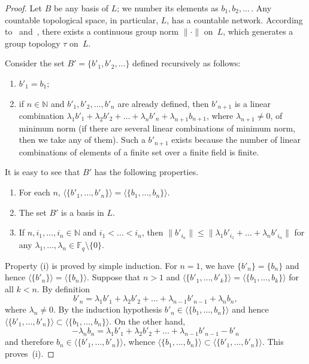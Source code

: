\documentclass[a4paper]{amsart}
\theoremstyle{definition}
\let\le\leqslant
\begin{document}
\begin{proof}
Let $B$ be any basis of $L$; we number its elements as $b_1,b_2, \dots$\,. Any countable 
topological space, in particular, $L$, has a countable network. According to~\cite[Lemma~8.1.12]{AT} 
and~\cite{Graev50}, there exists a continuous group norm $\lVert\boldsymbol\cdot\rVert$ on~$L$, which 
generates a group topology $\tau$ on~$L$. 

Consider the set $B'=\{b'_1, b'_2, \dots\}$ defined recursively as follows: 
\begin{enumerate} 
\item[(i)] 
$b'_1= b_1$; 

\item[(ii)] 
if $n\in \mathbb N$ and $b'_1, b'_2, \dots, b'_{n}$ are already defined, then $b'_{n+1}$ is a linear 
combination $\lambda_1 b'_1 +\lambda_2 b'_2 + \dots+ \lambda_n b'_{n}+\lambda_{n+1} b_{n+1}$, where 
$\lambda_{n+1}\ne 0$, of minimum norm (if there are several linear combinations of minimum norm, then we take any 
of them). Such a $b'_{n+1}$ exists because the number of linear combinations of elements of a finite set over a 
finite field is finite.
\end{enumerate}

It is easy to see that $B'$ has the following properties.
\begin{enumerate} 
\item[(iii)]
For each $n$,  $\langle \{b'_1, \dots, b'_n\}\rangle = \langle \{b_1, \dots, b_n\}\rangle $.
\item[(iv)]
The set $B'$ is a basis in $L$. 
\item[(v)]
If $n, i_1,\dots, i_n\in \mathbb N$ and $i_1<\dots <i_n$, then $\|b'_{i_n}\|\le 
\|\lambda_1 b'_{i_1}+\dots +\lambda_n b'_{i_n}\|$ for any $\lambda_1, \dots, \lambda_n\in 
\mathbb F_q\setminus\{0\}$. 
\end{enumerate} 

Property (i) is proved by simple induction. For $n=1$, we have $\{b'_n\}=\{b_n\}$ and hence 
$\langle \{b'_n\}\rangle =\langle \{b_n\}\rangle$. Suppose that $n>1$ and 
$\langle \{b'_1, \dots, b'_k\}\rangle = \langle \{b_1, \dots, b_k\}\rangle$ for all $k<n$. 
By definition 
$$
b'_n=\lambda_1 b'_1+ \lambda_2b'_2+ \dots +\lambda_{n-1}b'_{n-1}+\lambda_n b_n,
$$ 
where $\lambda_n\ne 0$. By the induction hypothesis 
$b'_n\in \langle \{b_1, \dots, b_n\}\rangle$ and hence $\langle \{b'_1, \dots, b'_n\}\rangle \subset 
\langle \{b_1, \dots, b_n\}\rangle$. On the other hand, 
$$
-\lambda_n b_n= \lambda_1 b'_1+ \lambda_2b'_2+ \dots +\lambda_{n-1}b'_{n-1}-b'_n
$$ 
and therefore  
$b_n\in \langle \{b'_1, \dots, b'_{n}\}\rangle$, whence 
$\langle \{b_1, \dots, b_n\}\rangle \subset \langle \{b'_1, \dots, b'_n\}\rangle$. This proves~(i).




\end{proof}
\end{document}
